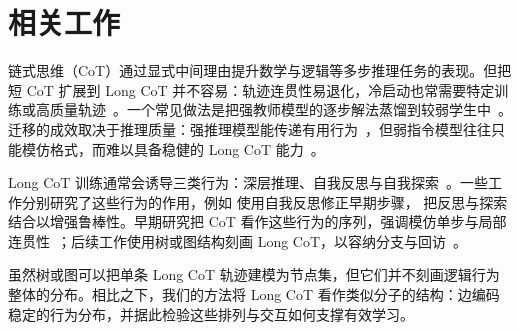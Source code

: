 \section{相关工作}
链式思维（CoT）通过显式中间理由提升数学与逻辑等多步推理任务的表现。但把短 CoT 扩展到 Long CoT 并不容易：轨迹连贯性易退化，冷启动也常需要特定训练或高质量轨迹~\citep{guo2025deepseek,moshkov2025aimo}。一个常见做法是把强教师模型的逐步解法蒸馏到较弱学生中~\citep{muennighoff2025s1,zhao20251}。迁移的成效取决于推理质量：强推理模型能传递有用行为~\citep{ye2025limo}，但弱指令模型往往只能模仿格式，而难以具备稳健的 Long CoT 能力~\citep{du2025the,chandra2025shape}。

Long CoT 训练通常会诱导三类行为：深层推理、自我反思与自我探索~\citep{o1,guo2025deepseek,chen2025towards}。一些工作分别研究了这些行为的作用，例如 \citet{madaan2023self} 使用自我反思修正早期步骤，\citet{shinn2023reflexion} 把反思与探索结合以增强鲁棒性。早期研究把 CoT 看作这些行为的序列，强调模仿单步与局部连贯性~\citep{wei2022chain,kojima2022large,chen2024unlocking}；后续工作使用树或图结构刻画 Long CoT，以容纳分支与回访~\citep{yao2023tree,yao2024got,hu2024treeplanner,besta2024graph}。

虽然树或图可以把单条 Long CoT 轨迹建模为节点集，但它们并不刻画逻辑行为整体的分布。相比之下，我们的方法将 Long CoT 看作类似分子的结构：边编码稳定的行为分布，并据此检验这些排列与交互如何支撑有效学习。
